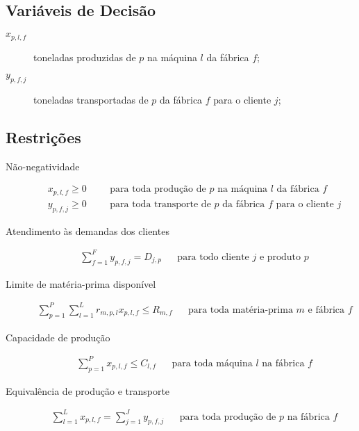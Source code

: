     \subsection{Variáveis de Decisão}

        \begin{description}
            \item[$x_{p,l,f}$] toneladas produzidas de $p$ na máquina $l$ da fábrica $f$;
            \item[$y_{p,f,j}$] toneladas transportadas de $p$ da fábrica $f$ para o cliente $j$;
        \end{description}

        \subsubsection{}

    \subsection{Restrições}

        \begin{description}
            \item[Não-negatividade] \begin{align*}
                x_{p,l,f} \geq 0
                && &\text{para toda produção de $p$ na máquina $l$ da fábrica $f$} \\
                y_{p,f,j} \geq 0
                && &\text{para toda transporte de $p$ da fábrica $f$ para o cliente $j$}
            \end{align*}
            \item[Atendimento às demandas dos clientes] \begin{align*}
                \sum_{f = 1}^F y_{p,f,j} = D_{j,p}
                && \text{para todo cliente $j$ e produto $p$}
            \end{align*}
            \item[Limite de matéria-prima disponível] \begin{align*}
                \sum_{p = 1}^P \sum_{l = 1}^L r_{m,p,l} x_{p,l,f} \leq R_{m,f}
                && \text{para toda matéria-prima $m$ e fábrica $f$}
            \end{align*}
            \item[Capacidade de produção] \begin{align*}
                \sum_{p = 1}^P x_{p,l,f} \leq C_{l,f}
                && \text{para toda máquina $l$ na fábrica $f$}
            \end{align*}
            \item[Equivalência de produção e transporte] \begin{align*}
                \sum_{l = 1}^L x_{p,l,f} = \sum_{j = 1}^J y_{p,f,j}
                && \text{para toda produção de $p$ na fábrica $f$}
            \end{align*}
        \end{description}

